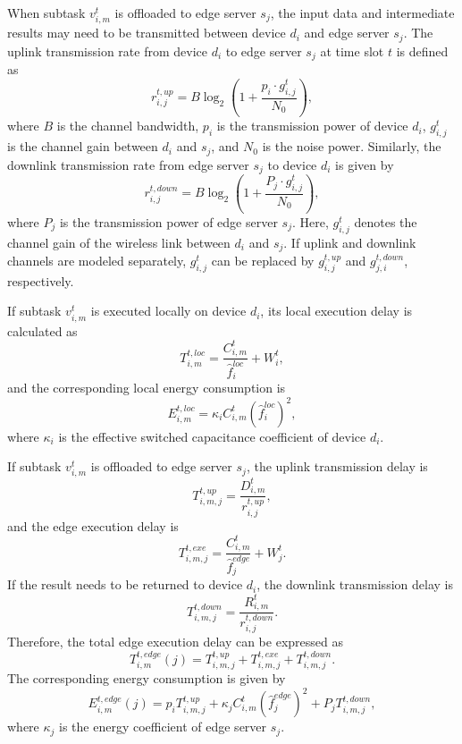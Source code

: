 \documentclass[conference]{IEEEtran}
\begin{document}
When subtask $v_{i,m}^t$ is offloaded to edge server $s_j$, the input data and intermediate results may need to be transmitted between device $d_i$ and edge server $s_j$. The uplink transmission rate from device $d_i$ to edge server $s_j$ at time slot $t$ is defined as
\begin{equation}
r_{i,j}^{t,up}=B\log_2\left(1+\frac{p_i \cdot g_{i,j}^t}{N_0}\right),
\end{equation}
where $B$ is the channel bandwidth, $p_i$ is the transmission power of device $d_i$, $g_{i,j}^t$ is the channel gain between $d_i$ and $s_j$, and $N_0$ is the noise power. Similarly, the downlink transmission rate from edge server $s_j$ to device $d_i$ is given by
\begin{equation}
r_{i,j}^{t,down}=B\log_2\left(1+\frac{P_j \cdot g_{i,j}^t}{N_0}\right),
\end{equation}
where $P_j$ is the transmission power of edge server $s_j$. Here, $g_{i,j}^t$ denotes the channel gain of the wireless link between $d_i$ and $s_j$. If uplink and downlink channels are modeled separately, $g_{i,j}^t$ can be replaced by $g_{i,j}^{t,up}$ and $g_{j,i}^{t,down}$, respectively.

If subtask $v_{i,m}^t$ is executed locally on device $d_i$, its local execution delay is calculated as
\begin{equation}
T_{i,m}^{t,loc}=\frac{C_{i,m}^t}{\hat{f}_i^{loc}}+W_i^t,
\end{equation}
and the corresponding local energy consumption is
\begin{equation}
E_{i,m}^{t,loc}=\kappa_i C_{i,m}^t(\hat{f}_i^{loc})^2,
\end{equation}
where $\kappa_i$ is the effective switched capacitance coefficient of device $d_i$.

If subtask $v_{i,m}^t$ is offloaded to edge server $s_j$, the uplink transmission delay is
\begin{equation}
T_{i,m,j}^{t,up}=\frac{D_{i,m}^t}{r_{i,j}^{t,up}},
\end{equation}
and the edge execution delay is
\begin{equation}
T_{i,m,j}^{t,exe}=\frac{C_{i,m}^t}{\hat{f}_j^{edge}}+W_j^t.
\end{equation}
If the result needs to be returned to device $d_i$, the downlink transmission delay is
\begin{equation}
T_{i,m,j}^{t,down}=\frac{R_{i,m}^t}{r_{i,j}^{t,down}}.
\end{equation}
Therefore, the total edge execution delay can be expressed as
\begin{equation}
T_{i,m}^{t,edge}(j)=T_{i,m,j}^{t,up}+T_{i,m,j}^{t,exe}+T_{i,m,j}^{t,down}.
\end{equation}
The corresponding energy consumption is given by
\begin{equation}
E_{i,m}^{t,edge}(j)=p_iT_{i,m,j}^{t,up}+\kappa_j C_{i,m}^t(\hat{f}_j^{edge})^2+P_jT_{i,m,j}^{t,down},
\end{equation}
where $\kappa_j$ is the energy coefficient of edge server $s_j$.
\end{document}
